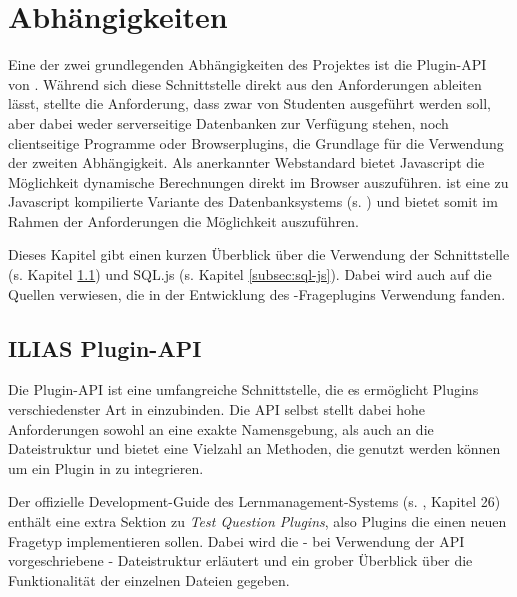\section{Abhängigkeiten}
\label{sec:schnittstellen}

Eine der zwei grundlegenden Abhängigkeiten des  Projektes ist die Plugin-API von . Während sich diese Schnittstelle direkt aus den Anforderungen ableiten lässt, stellte die Anforderung, dass  zwar von Studenten ausgeführt werden soll, aber dabei weder serverseitige Datenbanken zur Verfügung stehen, noch clientseitige Programme oder Browserplugins, die Grundlage für die Verwendung der zweiten Abhängigkeit. Als anerkannter Webstandard bietet Javascript die Möglichkeit dynamische Berechnungen direkt im Browser auszuführen.  ist eine zu Javascript kompilierte Variante des Datenbanksystems  (s. \cite{SQLjs}) und bietet somit im Rahmen der Anforderungen die Möglichkeit  auszuführen.

Dieses Kapitel gibt einen kurzen Überblick über die Verwendung der  Schnittstelle (s. Kapitel \ref{subsec:ilias-plugin-api}) und SQL.js (s. Kapitel \ref{subsec:sql-js}). Dabei wird auch auf die Quellen verwiesen, die in der Entwicklung des -Frageplugins Verwendung fanden. 

\subsection{ILIAS Plugin-API}
\label{subsec:ilias-plugin-api}
    Die  Plugin-API ist eine umfangreiche Schnittstelle, die es ermöglicht Plugins verschiedenster Art in  einzubinden. Die API selbst stellt dabei hohe Anforderungen sowohl an eine exakte Namensgebung, als auch an die Dateistruktur und bietet eine Vielzahl an Methoden, die genutzt werden können um ein Plugin in  zu integrieren. 
    
    Der offizielle Development-Guide des Lernmanagement-Systems  (s. \cite{IliasDevelopmentGuide}, Kapitel 26) enthält eine extra Sektion zu \glqq\textit{Test Question Plugins}\grqq , also Plugins die einen neuen Fragetyp implementieren sollen. Dabei wird die - bei Verwendung der API vorgeschriebene - Dateistruktur erläutert und ein grober Überblick über die Funktionalität der einzelnen Dateien gegeben.
    
